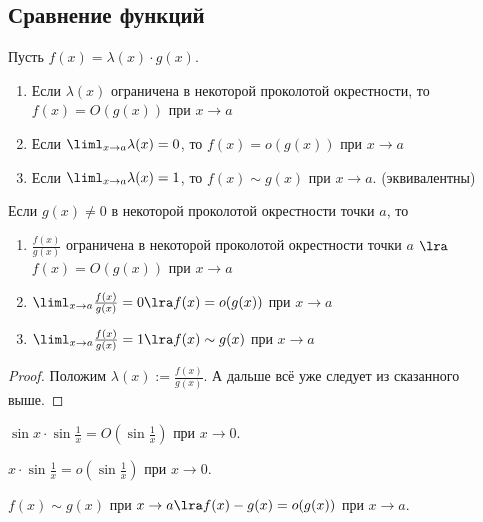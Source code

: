 \subsection{Сравнение функций}

\begin{definition}
	Пусть $f(x) = \lambda(x) \cdot g(x)$.
	\begin{enumerate}
		\item Если $\lambda(x)$ ограничена в некоторой проколотой окрестности, то $f(x) = O(g(x))$ при $x \to a$
		
		\item Если $\liml_{x \to a} \lambda(x) = 0$, то $f(x) = o(g(x))$ при $x \to a$
		
		\item Если $\liml_{x \to a} \lambda(x) = 1$, то $f(x) \sim g(x)$ при $x \to a$. (эквивалентны)
	\end{enumerate}
\end{definition}

\begin{theorem}
	Если $g(x) \neq 0$ в некоторой проколотой окрестности точки $a$, то
	\begin{enumerate}
		\item $\frac{f(x)}{g(x)}$ ограничена в некоторой проколотой окрестности точки $a$ $\lra$ $f(x) = O(g(x))$ при $x \to a$
		
		\item $\liml_{x \to a} \frac{f(x)}{g(x)} = 0 \lra f(x) = o(g(x))$ при $x \to a$
		
		\item $\liml_{x \to a} \frac{f(x)}{g(x)} = 1 \lra f(x) \sim g(x)$ при $x \to a$
	\end{enumerate}
\end{theorem}

\begin{proof}
	Положим $\lambda(x) := \frac{f(x)}{g(x)}$. А дальше всё уже следует из сказанного выше.
\end{proof}

\begin{example}
	$\sin x \cdot \sin \frac{1}{x} = O(\sin \frac{1}{x})$ при $x \to 0$.
\end{example}

\begin{example}
	$x \cdot \sin \frac{1}{x} = o(\sin \frac{1}{x})$ при $x \to 0$.
\end{example}

\begin{theorem}
	$f(x) \sim g(x)$ при $x \to a \lra f(x) - g(x) = o(g(x))$ при $x \to a$.
\end{theorem}

